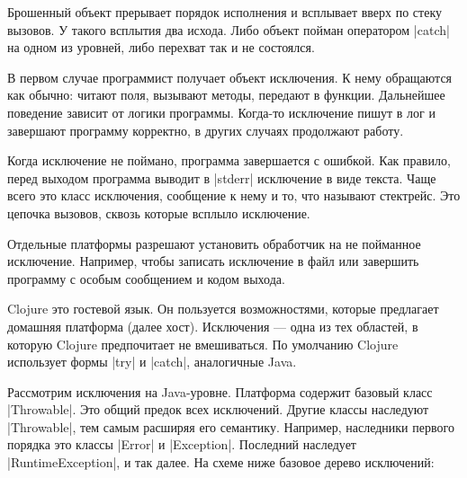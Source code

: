 Брошенный объект прерывает порядок исполнения и всплывает вверх по стеку
вызовов. У такого всплытия два исхода. Либо объект пойман оператором \spverb|catch| на
одном из уровней, либо перехват так и не состоялся.

В первом случае программист получает объект исключения. К нему обращаются как
обычно: читают поля, вызывают методы, передают в функции. Дальнейшее поведение
зависит от логики программы. Когда-то исключение пишут в лог и завершают
программу корректно, в других случаях продолжают работу.

Когда исключение не поймано, программа завершается с ошибкой. Как правило, перед
выходом программа выводит в \spverb|stderr| исключение в виде текста. Чаще всего это
класс исключения, сообщение к нему и то, что называют стектрейс. Это цепочка
вызовов, сквозь которые всплыло исключение.

Отдельные платформы разрешают установить обработчик на не пойманное
исключение. Например, чтобы записать исключение в файл или завершить программу с
особым сообщением и кодом выхода.

Clojure это гостевой язык. Он пользуется возможностями, которые предлагает
домашняя платформа (далее хост). Исключения — одна из тех областей, в которую
Clojure предпочитает не вмешиваться. По умолчанию Clojure использует формы \spverb|try|
и \spverb|catch|, аналогичные Java.

Рассмотрим исключения на Java-уровне. Платформа содержит базовый класс
\spverb|Throwable|. Это общий предок всех исключений. Другие классы наследуют
\spverb|Throwable|, тем самым расширяя его семантику. Например, наследники первого
порядка это классы \spverb|Error| и \spverb|Exception|. Последний наследует
\spverb|RuntimeException|, и так далее. На схеме ниже базовое дерево исключений:


